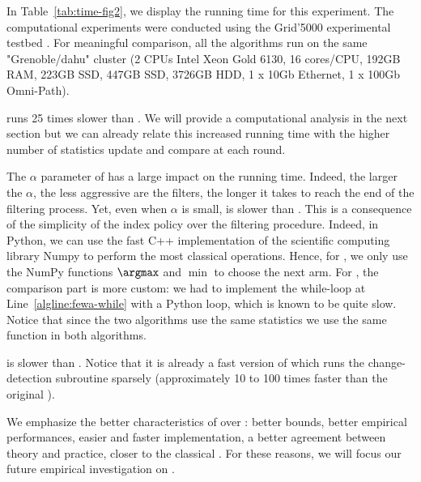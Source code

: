 In Table~\ref{tab:time-fig2}, we display the running time for this experiment. The computational experiments were conducted using the Grid’5000 experimental testbed \citep{grid5000}. For meaningful comparison, all the algorithms run on the same "Grenoble/dahu" cluster (2 CPUs Intel Xeon Gold 6130, 16 cores/CPU, 192GB RAM, 223GB SSD, 447GB SSD, 3726GB HDD, 1 x 10Gb Ethernet, 1 x 100Gb Omni-Path). 

\RAWUCB runs 25 times slower than \wSWA. We will provide a computational analysis in the next section but we can already relate this increased running time with the higher number of statistics \RAWUCB update and compare at each round.

The $\alpha$ parameter of \FEWA has a large impact on the running time. Indeed, the larger the $\alpha$, the less aggressive are the filters, the longer it takes to reach the end of the filtering process. Yet, even when $\alpha$ is small, \FEWA is slower than \RAWUCB. This is a consequence of the simplicity of the index policy over the filtering procedure. Indeed, in Python, we can use the fast C++ implementation of the scientific computing library Numpy to perform the most classical operations. Hence, for \RAWUCB, we only use the NumPy functions $\argmax$ and $\min$ to choose the next arm. For \FEWA, the comparison part is more custom: we had to implement the while-loop at Line~\ref{algline:fewa-while} with a Python loop, which is known to be quite slow. Notice that since the two algorithms use the same statistics we use the same function \UPDATE in both algorithms.

\GLRUCB is slower than \RAWUCB. Notice that it is already a fast version of \GLRUCB which runs the change-detection subroutine sparsely (approximately 10 to 100 times faster than the original \GLRUCB).
\begin{remark}
We emphasize the better characteristics of \RAWUCB over \FEWA: better bounds, better empirical performances, easier and faster implementation, a better agreement between theory and practice, closer to the classical \UCB. For these reasons, we will focus our future empirical investigation on \RAWUCB.
\end{remark}